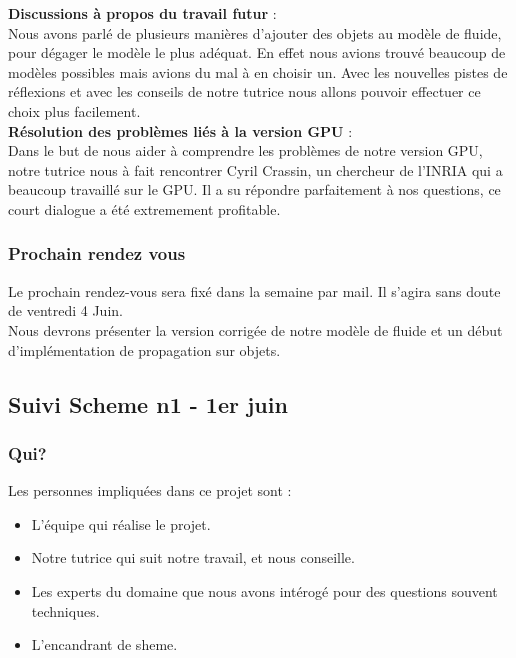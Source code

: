 \documentclass[a4paper,10pt]{article}
\begin{document}
\textbf{Discussions à propos du travail futur} :  \\
    Nous avons parlé de plusieurs manières d'ajouter des objets au modèle de fluide, 
    pour dégager le modèle le plus adéquat. En effet nous avions trouvé beaucoup de modèles 
    possibles mais avions du mal à en choisir un. Avec les nouvelles pistes de 
    réflexions et avec les conseils de notre tutrice nous allons pouvoir effectuer
    ce choix plus facilement.\\
    
\textbf{Résolution des problèmes liés à la version GPU} :  \\
    Dans le but de nous aider à comprendre les problèmes de notre version GPU, 
    notre tutrice nous à fait rencontrer Cyril Crassin, un chercheur de l'INRIA qui
    a beaucoup travaillé sur le GPU. Il a su répondre parfaitement à nos questions,
    ce court dialogue a été extremement profitable. \\

\subsubsection{Prochain rendez vous}
Le prochain rendez-vous sera fixé dans la semaine par mail. Il s'agira sans doute de ventredi 4 Juin.\\
Nous devrons présenter la version corrigée de notre modèle de fluide et un début d'implémentation de propagation
sur objets.\\



\subsection{Suivi Scheme n1 - 1er juin}
\subsubsection{Qui?}
Les personnes impliquées dans ce projet sont :
\begin{itemize}
\item L'équipe qui réalise le projet.
\item Notre tutrice qui suit notre travail, et nous conseille.
\item Les experts du domaine que nous avons intérogé pour des questions souvent techniques.
\item L'encandrant de sheme.
\end{itemize}
\end{document}
